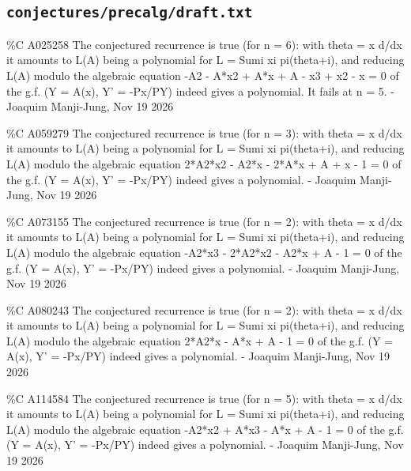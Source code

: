 \subsection*{\texttt{conjectures/precalg/draft.txt}}
{\small\raggedright\ttfamily
\%C A025258 The conjectured recurrence is true (for n = 6): with theta = x d/dx it amounts to L(A) being a polynomial for L = Sumi xi pi(theta+i), and reducing L(A) modulo the algebraic equation -A2 - A*x2 + A*x + A - x3 + x2 - x = 0 of the g.f. (Y = A(x), Y' = -Px/PY) indeed gives a polynomial. It fails at n = 5. - Joaquim Manji-Jung, Nov 19 2026\par
\%C A059279 The conjectured recurrence is true (for n = 3): with theta = x d/dx it amounts to L(A) being a polynomial for L = Sumi xi pi(theta+i), and reducing L(A) modulo the algebraic equation 2*A2*x2 - A2*x - 2*A*x + A + x - 1 = 0 of the g.f. (Y = A(x), Y' = -Px/PY) indeed gives a polynomial. - Joaquim Manji-Jung, Nov 19 2026\par
\%C A073155 The conjectured recurrence is true (for n = 2): with theta = x d/dx it amounts to L(A) being a polynomial for L = Sumi xi pi(theta+i), and reducing L(A) modulo the algebraic equation -A2*x3 - 2*A2*x2 - A2*x + A - 1 = 0 of the g.f. (Y = A(x), Y' = -Px/PY) indeed gives a polynomial. - Joaquim Manji-Jung, Nov 19 2026\par
\%C A080243 The conjectured recurrence is true (for n = 2): with theta = x d/dx it amounts to L(A) being a polynomial for L = Sumi xi pi(theta+i), and reducing L(A) modulo the algebraic equation 2*A2*x - A*x + A - 1 = 0 of the g.f. (Y = A(x), Y' = -Px/PY) indeed gives a polynomial. - Joaquim Manji-Jung, Nov 19 2026\par
\%C A114584 The conjectured recurrence is true (for n = 5): with theta = x d/dx it amounts to L(A) being a polynomial for L = Sumi xi pi(theta+i), and reducing L(A) modulo the algebraic equation -A2*x2 + A*x3 - A*x + A - 1 = 0 of the g.f. (Y = A(x), Y' = -Px/PY) indeed gives a polynomial. - Joaquim Manji-Jung, Nov 19 2026\par
}
